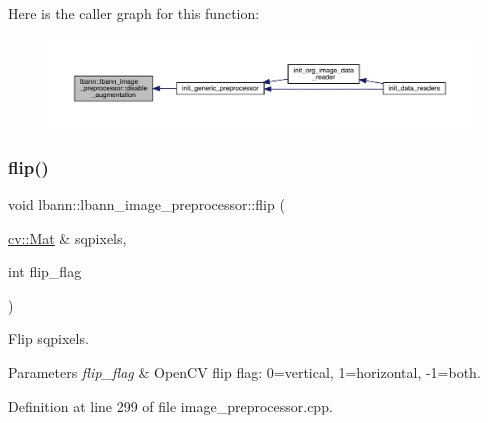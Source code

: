 Here is the caller graph for this function\+:\nopagebreak
\begin{figure}[H]
\begin{center}
\leavevmode
\includegraphics[width=350pt]{classlbann_1_1lbann__image__preprocessor_a871cb543ee6c132a76e16045a1a2a9f3_icgraph}
\end{center}
\end{figure}
\mbox{\label{classlbann_1_1lbann__image__preprocessor_a12d9f7056a5e68185ea0e85e14c17bcf}} 
\subsubsection{\texorpdfstring{flip()}{flip()}}
{\footnotesize\ttfamily void lbann\+::lbann\+\_\+image\+\_\+preprocessor\+::flip (\begin{DoxyParamCaption}\item[{\hyperlink{base_8hpp_a68f11fdc31b62516cb310831bbe54d73}{cv\+::\+Mat} \&}]{sqpixels,  }\item[{int}]{flip\+\_\+flag }\end{DoxyParamCaption})\hspace{0.3cm}{\ttfamily [protected]}}

Flip sqpixels. 
\begin{DoxyParams}{Parameters}
{\em flip\+\_\+flag} & Open\+CV flip flag\+: 0=vertical, 1=horizontal, -\/1=both. \\
\hline
\end{DoxyParams}


Definition at line 299 of file image\+\_\+preprocessor.\+cpp.


